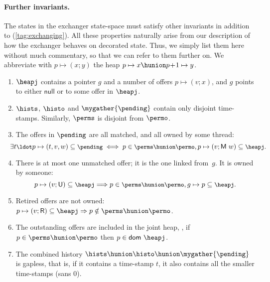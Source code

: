 \paragraph{Further invariants.}
%
The states in the exchanger state-space must satisfy other invariants
in addition to (\ref{tag:exchanging}). All these properties naturally
arise from our description of how the exchanger behaves on decorated
state. Thus, we simply list them here without much commentary, so that
we can refer to them further on. We abbreviate with $p \mapsto (x; y)$
the heap $p \mapsto x \hunion p\!+\!1 \mapsto y$.

\begin{enumerate}[label=(\roman*)]
\item\label{exP} $\heapj$ contains a pointer $g$ and a number of
  offers $p \mapsto (v; x)$, and $g$ points to either $\mathsf{null}$
  or to some offer in $\heapj$.

\item $\hists$, $\histo$ and $\mygather{\pending}$ contain only
  disjoint time-stamps. Similarly, $\perms$ is disjoint from $\permo$.

\item\label{matched} The offers in $\pending$ are all matched, and all
  owned by some thread:
\[
\!\!\!\!\!\!
{\small{
\exists t\ldot p \mapsto (t, v, w) \subseteq \pending \iff p \in
\perms \hunion \permo, p \mapsto (v; \Matched w) \subseteq \heapj.
}}
\]
\item There is at most one unmatched offer; it is the one linked
  from~$g$. It is owned by someone:
\[
{\small{
p \mapsto (v; \Unmatched) \subseteq \heapj \Longrightarrow p \in \perms \hunion
\permo, g \mapsto p \subseteq \heapj.
}}
\]
\item Retired offers are not owned: $p \mapsto (v; \Retired)
  \subseteq \heapj \Rightarrow p \notin \perms \hunion \permo$.

\item The outstanding offers are included in the joint heap, \ie, if
  $p \in \perms \hunion \permo$ then $p \in \mathsf{dom}\ \heapj$.

\item\label{ex:gapless} The combined history $\hists \hunion \histo \hunion
  \mygather{\pending}$ is gapless, that is, if it contains a
  time-stamp $t$, it also contains all the smaller time-stamps (sans
  0).

\end{enumerate}

